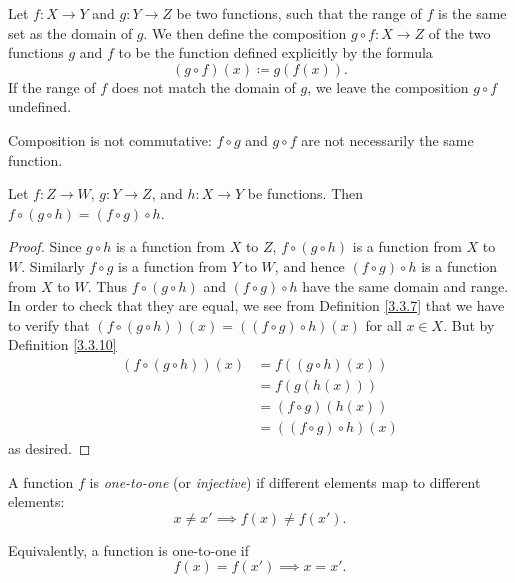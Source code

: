 \setcounter{theorem}{9}
\begin{definition}[Composition]\label{3.3.10}
Let \(f : X \to Y\) and \(g : Y \to Z\) be two functions, such that the range of \(f\) is the same set as the domain of \(g\).
We then define the composition \(g \circ f : X \to Z\) of the two functions \(g\) and \(f\) to be the function defined explicitly by the formula
\[
    (g \circ f)(x) \coloneqq g(f(x)).
\]
If the range of \(f\) does not match the domain of \(g\), we leave the composition \(g \circ f\) undefined.
\end{definition}

\begin{note}
Composition is not commutative: \(f \circ g\) and \(g \circ f\) are not necessarily the same function.
\end{note}

\setcounter{theorem}{11}
\begin{lemma}\label{3.3.12}
Let \(f : Z \to W\), \(g : Y \to Z\), and \(h : X \to Y\) be functions.
Then \(f \circ (g \circ h) = (f \circ g) \circ h\).
\end{lemma}

\begin{proof}
Since \(g \circ h\) is a function from \(X\) to \(Z\), \(f \circ (g \circ h)\) is a function from \(X\) to \(W\).
Similarly \(f \circ g\) is a function from \(Y\) to \(W\), and hence \((f \circ g) \circ h\) is a function from \(X\) to \(W\).
Thus \(f \circ (g \circ h)\) and \((f \circ g) \circ h\) have the same domain and range.
In order to check that they are equal, we see from Definition \ref{3.3.7} that we have to verify that \((f \circ (g \circ h))(x) = ((f \circ g) \circ h)(x)\) for all \(x \in X\).
But by Definition \ref{3.3.10}
\begin{align*}
(f \circ (g \circ h))(x)
&= f((g \circ h)(x)) \\
&= f(g(h(x))) \\
&= (f \circ g)(h(x)) \\
&= ((f \circ g) \circ h)(x)
\end{align*}
as desired.
\end{proof}

\setcounter{theorem}{13}
\begin{definition}\label{3.3.14}
A function \(f\) is \emph{one-to-one} (or \emph{injective}) if different elements map to different elements:
\[
    x \neq x' \implies f(x) \neq f(x').
\]

Equivalently, a function is one-to-one if
\[
    f(x) = f(x') \implies x = x'.
\]
\end{definition}

